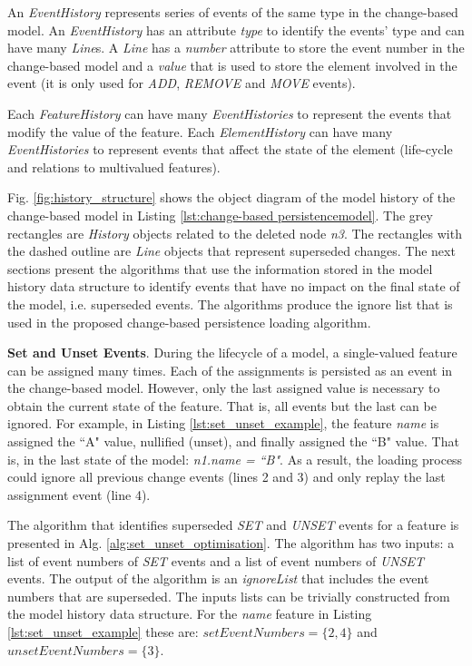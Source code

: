 \documentclass[12pt, a4paper]{report} \usepackage[titletoc]{appendix}
\begin{document}
An \emph{EventHistory} represents series of events of the same type in the change-based model. An \emph{EventHistory} has an attribute \emph{type} to identify the events' type and can have many \emph{Line}s. A \emph{Line} has a \emph{number} attribute to store the event number in the change-based model and a \emph{value} that is used to store the element involved in the event (it is only used for \emph{ADD}, \emph{REMOVE} and \emph{MOVE} events).

Each \emph{FeatureHistory} can have many \emph{EventHistories} to represent the events that modify the value of the feature. Each \emph{ElementHistory} can have many \emph{EventHistories} to represent events that affect the state of the element (life-cycle and relations to multivalued features).

Fig. \ref{fig:history_structure} shows the object diagram of the model history of the change-based model in Listing \ref{lst:change-based persistencemodel}. The grey rectangles are \emph{History} objects related to the deleted node \emph{n3}. The rectangles with the dashed outline are \emph{Line} objects that represent superseded changes. The next sections present the algorithms that use the information stored in the model history data structure to identify events that have no impact on the final state of the model, i.e. superseded events. The algorithms produce the ignore list that is used in the proposed change-based persistence loading algorithm.

\textbf{Set and Unset Events}\label{subsec:set_and_unset_events}. During the lifecycle of a model, a single-valued feature can be assigned many times. Each of the assignments is persisted as an event in the change-based model. However, only the last assigned value is necessary to obtain the current state of the feature.  That is, all events but the last can be ignored. For example, in Listing \ref{lst:set_unset_example}, the feature \emph{name} is assigned the ``A" value, nullified (unset), and finally assigned the ``B" value. That is, in the last state of the model: \emph{n1.name = ``B"}. As a result, the loading process could ignore all previous change events (lines 2 and 3) and only replay the last assignment event (line 4). 

The algorithm that identifies superseded \emph{SET} and \emph{UNSET} events for a feature is presented in Alg. \ref{alg:set_unset_optimisation}. The algorithm has two inputs: a list of event numbers of \emph{SET} events and a list of event numbers of \emph{UNSET} events. The output of the algorithm is an \emph{ignoreList} that includes the event numbers that are superseded. The inputs lists can be trivially constructed from the model history data structure. For the \emph{name} feature in Listing \ref{lst:set_unset_example} these are: $setEventNumbers = \{2,4\}$ and $unsetEventNumbers = \{3\}$.
\end{document}
